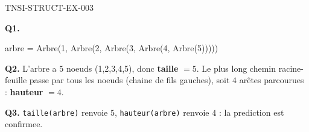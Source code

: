\begin{corrige}{TNSI-STRUCT-EX-003}

\textbf{Q1.}
\begin{python}
arbre = Arbre(1, Arbre(2, Arbre(3, Arbre(4, Arbre(5)))))
\end{python}

\textbf{Q2.} L'arbre a $5$ noeuds (1,2,3,4,5), donc \textbf{taille} $=5$. Le plus long chemin racine-feuille passe par tous les noeuds (chaine de fils gauches), soit $4$ arêtes parcourues : \textbf{hauteur} $=4$.

\textbf{Q3.} \lstinline{taille(arbre)} renvoie $5$, \lstinline{hauteur(arbre)} renvoie $4$ : la prediction est confirmee.

\end{corrige}
